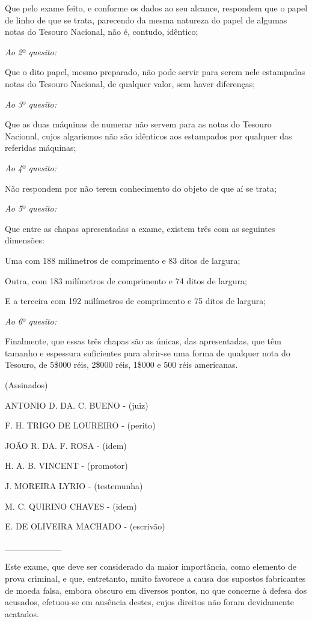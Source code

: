 Que pelo exame feito, e conforme os dados ao seu alcance, respondem que
o papel de linho de que se trata, parecendo da mesma natureza do papel
de algumas notas do Tesouro Nacional, não é, contudo, idêntico;

\emph{Ao 2}º \emph{quesito:}

Que o dito papel, mesmo preparado, não pode servir para serem nele
estampadas notas do Tesouro Nacional, de qualquer valor, sem haver
diferenças;

\emph{Ao 3}º \emph{quesito:}

Que as duas máquinas de numerar não servem para as notas do Tesouro
Nacional, cujos algarismos não são idênticos aos estampados por qualquer
das referidas máquinas;

\emph{Ao 4}º \emph{quesito:}

Não respondem por não terem conhecimento do objeto de que aí se trata;

\emph{Ao 5}º \emph{quesito:}

Que entre as chapas apresentadas a exame, existem três com as seguintes
dimensões:

Uma com 188 milímetros de comprimento e 83 ditos de largura;

Outra, com 183 milímetros de comprimento e 74 ditos de largura;

E a terceira com 192 milímetros de comprimento e 75 ditos de largura;

\emph{Ao 6}º \emph{quesito:}

Finalmente, que essas três chapas são as únicas, das apresentadas, que
têm tamanho e espessura suficientes para abrir-se uma forma de qualquer
nota do Tesouro, de 5\$000 réis, 2\$000 réis, 1\$000 e 500 réis
americanas.

(Assinados)

ANTONIO D. DA. C. BUENO - (juiz)

F. H. TRIGO DE LOUREIRO - (perito)

JOÃO R. DA. F. ROSA - (idem)

H. A. B. VINCENT - (promotor)

J. MOREIRA LYRIO - (testemunha)

M. C. QUIRINO CHAVES - (idem)

E. DE OLIVEIRA MACHADO - (escrivão)

\_\_\_\_\_\_\_\_\_

Este exame, que deve ser considerado da maior importância, como elemento
de prova criminal, e que, entretanto, muito favorece a causa dos
supostos fabricantes de moeda falsa, embora obscuro em diversos pontos,
no que concerne à defesa dos acusados, efetuou-se em ausência destes,
cujos direitos não foram devidamente acatados.

